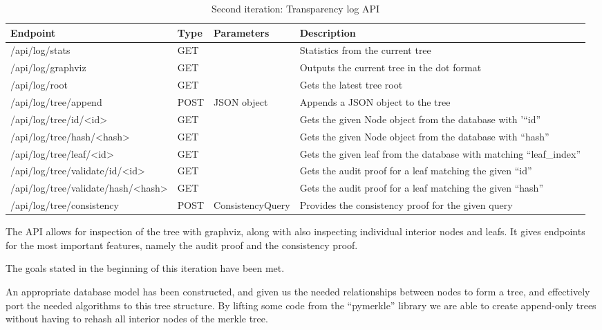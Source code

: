 \documentclass[../Main/thesis.tex]{subfiles}
\begin{document}
\begin{table}[H]
\footnotesize
\centering
\settowidth{}
\setlength\extrarowheight{2pt}
\begin{tabulary}{1.0\textwidth}{|l|L|l|L|}
\hline
    \textbf{Endpoint} & 
    \textbf{Type} & 
    \textbf{Parameters} & 
    \textbf{Description} \\
\hline
    /api/log/stats & GET & & Statistics from the current tree \\ \hline
    /api/log/graphviz & GET & & Outputs the current tree in the dot format \\ \hline
    /api/log/root & GET & & Gets the latest tree root \\ \hline
    /api/log/tree/append & POST & JSON object & Appends a JSON object to the tree \\ \hline
    /api/log/tree/id/<id> & GET & & Gets the given Node object from the database with '``id''\\ \hline
    /api/log/tree/hash/<hash> & GET & & Gets the given Node object from the database with ``hash''\\ \hline
    /api/log/tree/leaf/<id> & GET & & Gets the given leaf from the database with matching ``leaf\_index''\\ \hline
    /api/log/tree/validate/id/<id> & GET & & Gets the audit proof for a leaf matching the given ``id''\\ \hline
    /api/log/tree/validate/hash/<hash> & GET & & Gets the audit proof for a leaf matching the given ``hash''\\ \hline
    /api/log/tree/consistency & POST & ConsistencyQuery & Provides the consistency proof for the given query\\ \hline
\end{tabulary}
\caption{Second iteration: Transparency log API}
\label{api:transparency_log}
\end{table}

The API allows for inspection of the tree with graphviz, along with also
inspecting individual interior nodes and leafs. It gives endpoints for the most
important features, namely the audit proof and the consistency proof.

The goals stated in the beginning of this iteration have been met. 

An appropriate database model has been constructed, and given us the needed
relationships between nodes to form a tree, and effectively port the needed
algorithms to this tree structure. By lifting some code from the ``pymerkle''
library we are able to create append-only trees without having to rehash all
interior nodes of the merkle tree.
\end{document}
